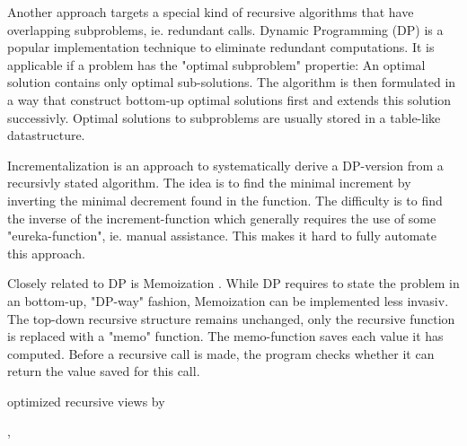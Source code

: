 Another approach targets a special kind of recursive algorithms that have overlapping subproblems, ie. redundant calls. Dynamic Programming (DP) is a popular implementation technique to eliminate redundant computations. It is applicable if a problem has the "optimal subproblem" propertie: An optimal solution contains only optimal sub-solutions. The algorithm is then formulated in a way that construct bottom-up optimal solutions first and extends this solution successivly. Optimal solutions to subproblems are usually stored in a table-like datastructure. \cite{}

Incrementalization is an approach to systematically derive a DP-version from a recursivly stated algorithm. The idea is to find the minimal increment by inverting the minimal decrement found in the function. The difficulty is to find the inverse of the increment-function which generally requires the use of some "eureka-function", ie. manual assistance. This makes it hard to fully automate this approach.

Closely related to DP is Memoization \cite{memo}. While DP requires to state the problem in an bottom-up, "DP-way" fashion, Memoization can be implemented less invasiv. The top-down recursive structure remains unchanged, only the recursive function is replaced with a "memo" function. The memo-function saves each value it has computed. Before a recursive call is made, the program checks whether it can return the value saved for this call.


\cite{optimizingRecursiveQueries} optimized recursive views by



\cite{denis_hirn}, \cite{peter_richter}
\cite{extendingRecursionInSQL}